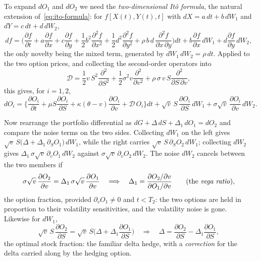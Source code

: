 To expand $dO_1$ and $dO_2$ we need the \emph{two-dimensional It\^o formula}, the natural extension of~\eqref{eq:ito-formula}: for $f[X(t), Y(t), t]$ with $dX = a\, dt + b\, dW_1$ and $dY = c\, dt + d\, dW_2$,
\begin{equation}
df = \biggl(\frac{\partial f}{\partial t} + a\frac{\partial f}{\partial x} + c\frac{\partial f}{\partial y} + \frac{1}{2}b^2\frac{\partial^2 f}{\partial x^2} + \frac{1}{2}d^2\frac{\partial^2 f}{\partial y^2} + \rho\, b\, d\,\frac{\partial^2 f}{\partial x\,\partial y}\biggr)dt + b\frac{\partial f}{\partial x}\, dW_1 + d\frac{\partial f}{\partial y}\, dW_2,
\end{equation}
the only novelty being the mixed term, generated by $dW_1\,dW_2 = \rho\,dt$.
Applied to the two option prices, and collecting the second-order operators into
\begin{equation}
\mathcal{D} = \frac{1}{2}v\, S^2\frac{\partial^2}{\partial S^2} + \frac{1}{2}\sigma^2 v\frac{\partial^2}{\partial v^2} + \rho\,\sigma\, v\, S\frac{\partial^2}{\partial S\,\partial v},
\end{equation}
this gives, for $i=1,2$,
\begin{equation}
dO_i = \biggl\{\frac{\partial O_i}{\partial t} + \mu S\frac{\partial O_i}{\partial S} + \kappa(\theta - v)\frac{\partial O_i}{\partial v} + \mathcal{D}\, O_i\biggr\}dt
+ \sqrt{v}\, S\,\frac{\partial O_i}{\partial S}\, dW_1
+ \sigma\sqrt{v}\,\frac{\partial O_i}{\partial v}\, dW_2.
\end{equation}

Now rearrange the portfolio differential as $dG + \Delta\, dS + \Delta_1\, dO_1 = dO_2$ and compare the noise terms on the two sides.
Collecting $dW_1$ on the left gives $\sqrt{v}\,S\bigl(\Delta + \Delta_1\,\partial_S O_1\bigr)\,dW_1$, while the right carries $\sqrt{v}\,S\,\partial_S O_2\, dW_1$; collecting $dW_2$ gives $\Delta_1\,\sigma\sqrt{v}\,\partial_v O_1\, dW_2$ against $\sigma\sqrt{v}\,\partial_v O_2\, dW_2$.
The noise $dW_2$ cancels between the two members if
\begin{equation}
\sigma\sqrt{v}\,\frac{\partial O_2}{\partial v} = \Delta_1\,\sigma\sqrt{v}\,\frac{\partial O_1}{\partial v}
\quad\Longrightarrow\quad
\Delta_1 = \frac{\partial O_2/\partial v}{\partial O_1/\partial v}
\qquad \text{(the \emph{vega ratio})},
\end{equation}
the option fraction, provided $\partial_v O_1\ne0$ and $t<T_2$: the two options are held in proportion to their volatility sensitivities, and the volatility noise is gone.
Likewise for $dW_1$,
\begin{equation}
\sqrt{v}\, S\,\frac{\partial O_2}{\partial S} = \sqrt{v}\, S\biggl(\Delta + \Delta_1\frac{\partial O_1}{\partial S}\biggr)
\quad\Longrightarrow\quad
\Delta = \frac{\partial O_2}{\partial S} - \Delta_1\frac{\partial O_1}{\partial S},
\end{equation}
the optimal stock fraction: the familiar delta hedge, with a \emph{correction} for the delta carried along by the hedging option.

